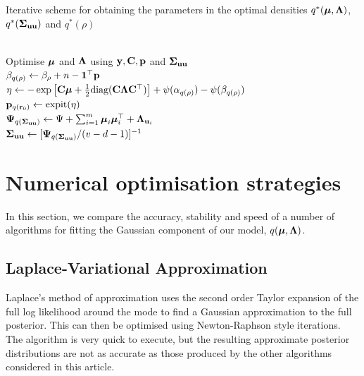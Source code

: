 \documentclass{article}[12pt]
\begin{document}
\begin{algorithm}
	\caption[Algorithm 1]{Iterative scheme for obtaining the parameters in the
		optimal densities $q^*({\boldsymbol \mu}, {\boldsymbol \Lambda})$, $q^*({\boldsymbol \Sigma}_{{\bf u} {\bf u}})$ and $q^*(\rho)$}
	\label{alg:algorithm_one}
	\begin{algorithmic}
		 \\[1ex]
		\STATE Optimise ${\boldsymbol \mu}$ and ${\boldsymbol \Lambda}$ using ${\bf y}, {\bf C}, {\bf p}$ and ${\boldsymbol \Sigma}_{{\bf u} {\bf u}}$ \\[1ex]
		\STATE $\beta_{q(\rho)} \leftarrow \beta_\rho + n - {\bf 1}^\top{\bf p}$ \\[1ex]
		\STATE $\eta \leftarrow -\exp \left [ {\bf C} {\boldsymbol \mu} + \tfrac{1}{2} \text{diag}{({\bf C}{\boldsymbol\Lambda}{\bf C}^\top)} \right ] + \psi{(\alpha_{q{(\rho)}})} - \psi{(\beta_{q{(\rho)}})}$ \\[1ex]
			\STATE ${\bf p}_{q({\bf r}_0)} \leftarrow \text{expit} (\eta)$ \\[1ex]
			\STATE ${\boldsymbol \Psi}_{q({\boldsymbol \Sigma}_{{\bf u} {\bf u}})} \leftarrow \Psi + \sum_{i=1}^m {\boldsymbol \mu}_i {\boldsymbol \mu}_i^\top + {\boldsymbol \Lambda}_{{{\bf u}}_i}$ \\[1ex]
			\STATE ${\boldsymbol \Sigma}_{{\bf u}{\bf u}} \leftarrow [{\boldsymbol \Psi}_{q({\boldsymbol \Sigma}_{{\bf u} {\bf u}})}/(v - d - 1)]^{-1}$
			\ENDWHILE
		\end{algorithmic}
	\end{algorithm}
	
	\section{Numerical optimisation strategies}
	\label{sec:algorithms}
	
	In this section, we compare the accuracy, stability and speed of a number of algorithms for fitting the
	Gaussian component of our model, $q({\boldsymbol \mu}, {\boldsymbol \Lambda})$.
	
	
	\subsection{Laplace-Variational Approximation}
	
	Laplace's method of approximation uses the second order Taylor expansion of the full log likelihood around the
	mode to find a Gaussian approximation to the full posterior. This can then be optimised using Newton-Raphson
	style iterations. The algorithm is very quick to execute, but the resulting approximate posterior
	distributions are not as accurate as those produced by the other algorithms considered in this article.
	
\end{document}
